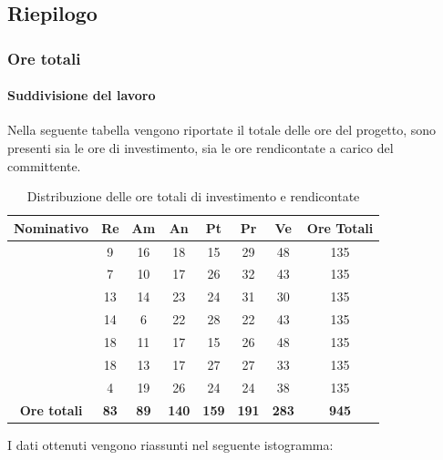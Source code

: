 \subsection{Riepilogo}
\subsubsection{Ore totali}
\paragraph{Suddivisione del lavoro}
Nella seguente tabella vengono riportate il totale delle ore del progetto, sono presenti sia le ore di investimento, sia le ore rendicontate a carico del committente.
\begin{table}[H]
		\begin{center}
			\setlength{\aboverulesep}{0pt}
			\setlength{\belowrulesep}{0pt}
			\setlength{\extrarowheight}{.75ex}
			\begin{tabular}{ c c c c c c c c }
				\rowcolor{AzzurroGruppo!30} 
				\textbf{Nominativo} & \textbf{Re} & \textbf{Am} & \textbf{An} & \textbf{Pt} & \textbf{Pr} & \textbf{Ve} & \textbf{Ore Totali}  \\
				\toprule
				\Davide    & 9 & 16 & 18 & 15 & 29 & 48 & 135 \\
				\Giosue    & 7 & 10 & 17 & 26 & 32 & 43 & 135 \\
				\Francesco & 13 & 14 & 23 & 24 & 31 & 30 & 135\\
				\Daniele   & 14 & 6 & 22 & 28 & 22 & 43 & 135\\
				\Lucrezia  & 18 & 11 & 17 & 15 & 26 & 48 & 135\\
				\Matteo    & 18 & 13 & 17 & 27 & 27 & 33 & 135\\
				\Tommaso   & 4 & 19 & 26 & 24 & 24 & 38 & 135\\
				 \textbf{Ore totali} & \textbf{83} & \textbf{89} & \textbf{140} & \textbf{159} & \textbf{191} & \textbf{283} & \textbf{945} \\
				\bottomrule
			\end{tabular}
			\caption{ Distribuzione delle ore totali di investimento e rendicontate}
		\end{center}
	\end{table}
	I dati ottenuti vengono riassunti nel seguente istogramma:
